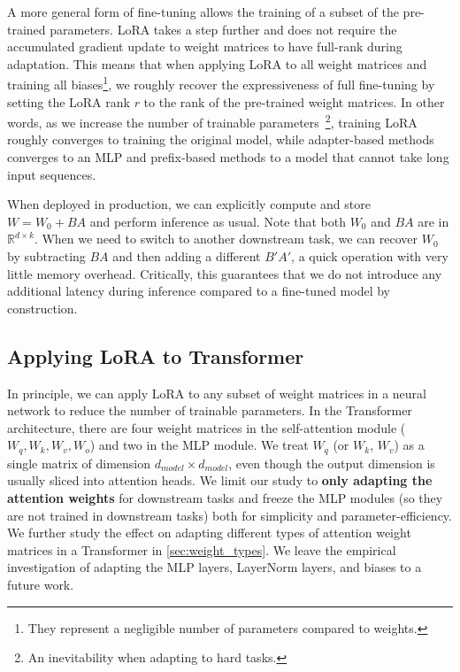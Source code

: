 A more general form of fine-tuning allows the training of a subset of the pre-trained parameters.
LoRA takes a step further and does not require the accumulated gradient update to weight matrices to have full-rank during adaptation.
This means that when applying LoRA to all weight matrices and training all biases\footnote{They represent a negligible number of parameters compared to weights.}, we roughly recover the expressiveness of full fine-tuning by setting the LoRA rank $r$ to the rank of the pre-trained weight matrices.
In other words, as we increase the number of trainable parameters~\footnote{An inevitability when adapting to hard tasks.}, training LoRA roughly converges to training the original model, while adapter-based methods converges to an MLP and prefix-based methods to a model that cannot take long input sequences.



When deployed in production, we can explicitly compute and store $W = W_0 + BA$ and perform inference as usual.
Note that both $W_0$ and $BA$ are in $\mathbb{R}^{d\times k}$.
When we need to switch to another downstream task, we can recover $W_0$ by subtracting $BA$ and then adding a different $B'A'$, a quick operation with very little memory overhead.
Critically, this guarantees that we do not introduce any additional latency during inference compared to a fine-tuned model by construction.











\subsection{Applying LoRA to Transformer}
\label{sec:apply_lora_to_tr}





In principle, we can apply LoRA to any subset of weight matrices in a neural network to reduce the number of trainable parameters.
In the Transformer architecture, there are four weight matrices in the self-attention module ($W_q, W_k, W_v, W_o$) and two in the MLP module.
We treat $W_q$ (or $W_k$, $W_v$) as a single matrix of dimension $d_{model} \times d_{model}$, even though the output dimension is usually sliced into attention heads.
We limit our study to \textbf{only adapting the attention weights} for downstream tasks and freeze the MLP modules (so they are not trained in downstream tasks) both for simplicity and parameter-efficiency.%
We further study the effect on adapting different types of attention weight matrices in a Transformer in \autoref{sec:weight_types}.
We leave the empirical investigation of adapting the MLP layers, LayerNorm layers, and biases to a future work.







